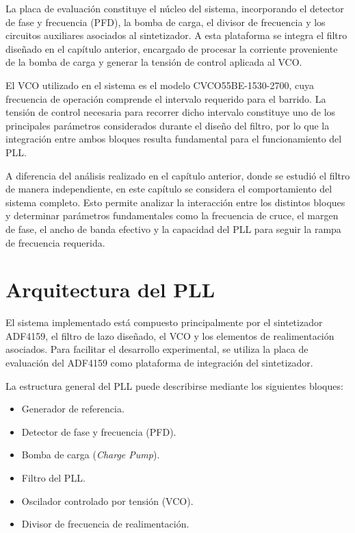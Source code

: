La placa de evaluación constituye el núcleo del sistema, incorporando el detector de fase y frecuencia (PFD), la bomba de carga, el divisor de frecuencia y los circuitos auxiliares asociados al sintetizador. A esta plataforma se integra el filtro diseñado en el capítulo anterior, encargado de procesar la corriente proveniente de la bomba de carga y generar la tensión de control aplicada al VCO.

El VCO utilizado en el sistema es el modelo CVCO55BE-1530-2700, cuya frecuencia de operación comprende el intervalo requerido para el barrido. La tensión de control necesaria para recorrer dicho intervalo constituye uno de los principales parámetros considerados durante el diseño del filtro, por lo que la integración entre ambos bloques resulta fundamental para el funcionamiento del PLL.

A diferencia del análisis realizado en el capítulo anterior, donde se estudió el filtro de manera independiente, en este capítulo se considera el comportamiento del sistema completo. Esto permite analizar la interacción entre los distintos bloques y determinar parámetros fundamentales como la frecuencia de cruce, el margen de fase, el ancho de banda efectivo y la capacidad del PLL para seguir la rampa de frecuencia requerida.

\section{Arquitectura del PLL}

El sistema implementado está compuesto principalmente por el sintetizador ADF4159, el filtro de lazo diseñado, el VCO y los elementos de realimentación asociados. Para facilitar el desarrollo experimental, se utiliza la placa de evaluación del ADF4159 como plataforma de integración del sintetizador.

La estructura general del PLL puede describirse mediante los siguientes bloques:

\begin{itemize}
\item Generador de referencia.
\item Detector de fase y frecuencia (PFD).
\item Bomba de carga (\textit{Charge Pump}).
\item Filtro del PLL.
\item Oscilador controlado por tensión (VCO).
\item Divisor de frecuencia de realimentación.
\end{itemize}

